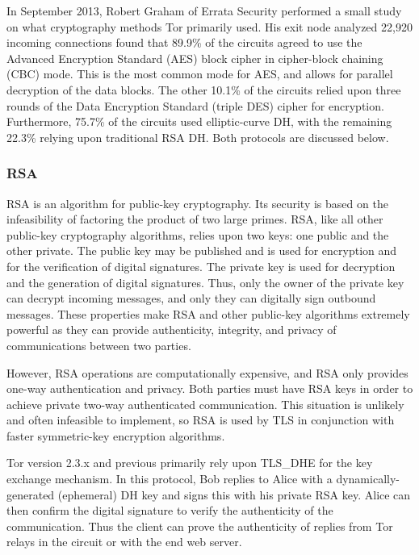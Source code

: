 \documentclass[journal]{IEEEtran}
\begin{document}
In September 2013, Robert Graham of Errata Security performed a small study on what cryptography methods Tor primarily used. His exit node analyzed 22,920 incoming connections found that 89.9\% of the circuits agreed to use the Advanced Encryption Standard (AES) block cipher in cipher-block chaining (CBC) mode. This is the most common mode for AES, and allows for parallel decryption of the data blocks. The other 10.1\% of the circuits relied upon three rounds of the Data Encryption Standard (triple DES) cipher for encryption. Furthermore, 75.7\% of the circuits used elliptic-curve DH, with the remaining 22.3\% relying upon traditional RSA DH.\cite{Graham2013} Both protocols are discussed below.

\subsubsection{RSA}

RSA is an algorithm for public-key cryptography. Its security is based on the infeasibility of factoring the product of two large primes. RSA, like all other public-key cryptography algorithms, relies upon two keys: one public and the other private. The public key may be published and is used for encryption and for the verification of digital signatures. The private key is used for decryption and the generation of digital signatures. Thus, only the owner of the private key can decrypt incoming messages, and only they can digitally sign outbound messages. These properties make RSA and other public-key algorithms extremely powerful as they can provide authenticity, integrity, and privacy of communications between two parties.

However, RSA operations are computationally expensive, and RSA only provides one-way authentication and privacy. Both parties must have RSA keys in order to achieve private two-way authenticated communication. This situation is unlikely and often infeasible to implement, so RSA is used by TLS in conjunction with faster symmetric-key encryption algorithms.

Tor version 2.3.x and previous primarily rely upon TLS\_DHE for the key exchange mechanism. In this protocol, Bob replies to Alice with a dynamically-generated (ephemeral) DH key and signs this with his private RSA key. Alice can then confirm the digital signature to verify the authenticity of the communication. Thus the client can prove the authenticity of replies from Tor relays in the circuit or with the end web server.
\end{document}
